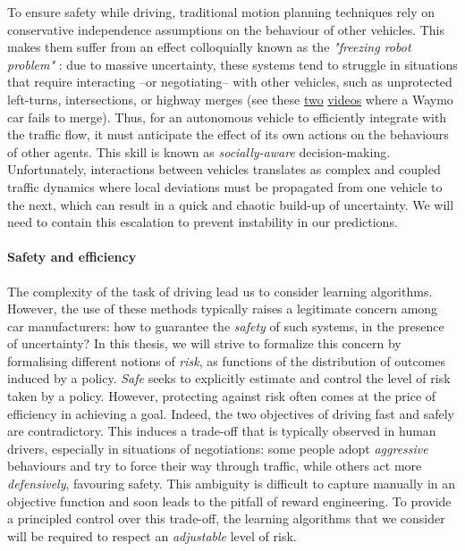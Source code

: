 To ensure safety while driving, traditional motion planning techniques rely on conservative independence assumptions on the behaviour of other vehicles. This makes them suffer from an effect colloquially known as the \emph{"freezing robot problem"} \citep{Trautman2010}: due to massive uncertainty, these systems tend to struggle in situations that require interacting --or negotiating-- with other vehicles, such as unprotected left-turns, intersections, or highway merges (see \eg these \href{https://www.youtube.com/watch?v=HjtiiGCe1pE}{two} \href{https://twitter.com/nitguptaa/status/990683818825736192}{videos} where a Waymo car fails to merge). 
Thus, for an autonomous vehicle to efficiently integrate with the traffic flow, it must anticipate the effect of its own actions on the behaviours of other agents. This skill is known as \emph{socially-aware} decision-making. Unfortunately, interactions between vehicles translates as complex and coupled traffic dynamics where local deviations must be propagated from one vehicle to the next, which can result in a quick and chaotic build-up of uncertainty. We will need to contain this escalation to prevent instability in our predictions.

\paragraph{Safety and efficiency}

The complexity of the task of driving lead us to consider learning algorithms. However, the use of these methods typically raises a legitimate concern among car manufacturers: how to guarantee the \emph{safety} of such systems, in the presence of uncertainty? In this thesis, we will strive to formalize this concern by formalising different notions of \emph{risk}, as functions of the distribution of outcomes induced by a policy. \emph{Safe}  seeks to explicitly estimate and control the level of risk taken by a policy.
However, protecting against risk often comes at the price of efficiency in achieving a goal. Indeed, the two objectives of driving fast and safely are contradictory. This induces a trade-off that is typically observed in human drivers, especially in situations of negotiations: some people adopt \emph{aggressive} behaviours and try to force their way through traffic, while others act more \emph{defensively}, favouring safety. This ambiguity is difficult to capture manually in an objective function and soon leads to the pitfall of reward engineering. To provide a principled control over this trade-off, the learning algorithms that we consider will be required to respect an \emph{adjustable} level of risk.

